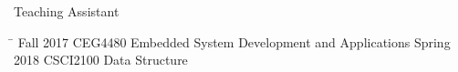 
\begin{rSection}{Teaching Assistant}
\begin{tabbing}
\hspace{1.0in}\= \kill
    Fall 2017    \>  CEG4480 Embedded System Development and Applications 
    Spring 2018 \> CSCI2100 Data Structure
\end{tabbing}
\end{rSection}

